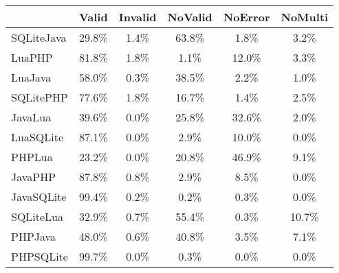 \begin{tabular}{l  c  c  c  c  c }
    \toprule
        & Valid & Invalid & NoValid & NoError & NoMulti \\
    \midrule
    SQLiteJava & 29.8\% & 1.4\% & 63.8\% & 1.8\% & 3.2\% \\
    LuaPHP & 81.8\% & 1.8\% & 1.1\% & 12.0\% & 3.3\% \\
    LuaJava & 58.0\% & 0.3\% & 38.5\% & 2.2\% & 1.0\% \\
    SQLitePHP & 77.6\% & 1.8\% & 16.7\% & 1.4\% & 2.5\% \\
    JavaLua & 39.6\% & 0.0\% & 25.8\% & 32.6\% & 2.0\% \\
    LuaSQLite & 87.1\% & 0.0\% & 2.9\% & 10.0\% & 0.0\% \\
    PHPLua & 23.2\% & 0.0\% & 20.8\% & 46.9\% & 9.1\% \\
    JavaPHP & 87.8\% & 0.8\% & 2.9\% & 8.5\% & 0.0\% \\
    JavaSQLite & 99.4\% & 0.2\% & 0.2\% & 0.3\% & 0.0\% \\
    SQLiteLua & 32.9\% & 0.7\% & 55.4\% & 0.3\% & 10.7\% \\
    PHPJava & 48.0\% & 0.6\% & 40.8\% & 3.5\% & 7.1\% \\
    PHPSQLite & 99.7\% & 0.0\% & 0.3\% & 0.0\% & 0.0\% \\
    \bottomrule
\end{tabular}
        
